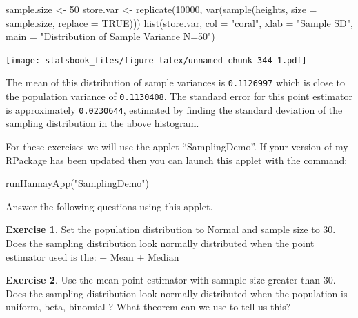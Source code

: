 \documentclass[
]{book}
\newenvironment{Shaded}{\begin{snugshade}}{\end{snugshade}}
\newcommand{\AttributeTok}[1]{\textcolor[rgb]{0.77,0.63,0.00}{#1}}
\newcommand{\ConstantTok}[1]{\textcolor[rgb]{0.00,0.00,0.00}{#1}}
\newcommand{\DecValTok}[1]{\textcolor[rgb]{0.00,0.00,0.81}{#1}}
\newcommand{\FunctionTok}[1]{\textcolor[rgb]{0.00,0.00,0.00}{#1}}
\newcommand{\NormalTok}[1]{#1}
\newcommand{\OtherTok}[1]{\textcolor[rgb]{0.56,0.35,0.01}{#1}}
\newcommand{\StringTok}[1]{\textcolor[rgb]{0.31,0.60,0.02}{#1}}
\theoremstyle{definition}
\theoremstyle{definition}
\theoremstyle{definition}
\newtheorem{exercise}{Exercise}[chapter]
\theoremstyle{definition}
\theoremstyle{remark}
\begin{document}
\begin{Shaded}
\begin{Highlighting}[]
\NormalTok{sample.size }\OtherTok{\textless{}{-}} \DecValTok{50}
\NormalTok{store.var }\OtherTok{\textless{}{-}} \FunctionTok{replicate}\NormalTok{(}\DecValTok{10000}\NormalTok{, }\FunctionTok{var}\NormalTok{(}\FunctionTok{sample}\NormalTok{(heights, }\AttributeTok{size =}\NormalTok{ sample.size, }\AttributeTok{replace =} \ConstantTok{TRUE}\NormalTok{)))}
\FunctionTok{hist}\NormalTok{(store.var, }\AttributeTok{col =} \StringTok{"coral"}\NormalTok{, }\AttributeTok{xlab =} \StringTok{"Sample SD"}\NormalTok{, }\AttributeTok{main =} \StringTok{"Distribution of Sample Variance N=50"}\NormalTok{)}
\end{Highlighting}
\end{Shaded}

\texttt{[image: statsbook\_files/figure-latex/unnamed-chunk-344-1.pdf]}

The mean of this distribution of sample variances is \texttt{0.1126997} which is close to the population variance of \texttt{0.1130408}. The standard error for this point estimator is approximately \texttt{0.0230644}, estimated by finding the standard deviation of the sampling distribution in the above histogram.

For these exercises we will use the applet ``SamplingDemo''. If your version of my RPackage has been updated then you can launch this applet with the command:

\begin{Shaded}
\begin{Highlighting}[]
\FunctionTok{runHannayApp}\NormalTok{(}\StringTok{"SamplingDemo"}\NormalTok{)}
\end{Highlighting}
\end{Shaded}

Answer the following questions using this applet.

\begin{exercise}
\protect\hypertarget{exr:unnamed-chunk-346}{}\label{exr:unnamed-chunk-346}Set the population distribution to Normal and sample size to 30. Does the sampling distribution look normally distributed when the point estimator used is the:
+ Mean
+ Median
\end{exercise}

\begin{exercise}
\protect\hypertarget{exr:unnamed-chunk-347}{}\label{exr:unnamed-chunk-347}Use the mean point estimator with samnple size greater than 30. Does the sampling distribution look normally distributed when the population is uniform, beta, binomial ? What theorem can we use to tell us this?
\end{exercise}
\end{document}
